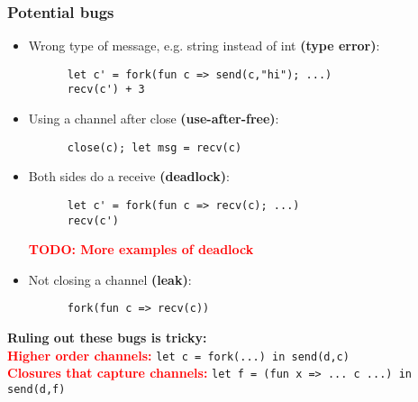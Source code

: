 \documentclass[aspectratio=169]{beamer}
\newcommand{\remph}[1] {\textcolor{red}{\textbf{#1}}}
\begin{document}
\begin{frame}[fragile]
  \frametitle{Potential bugs}

  \begin{itemize}
    \item Wrong type of message, e.g. string instead of int \textbf{(type error)}:
    \begin{lstlisting}
      let c' = fork(fun c => send(c,"hi"); ...)
      recv(c') + 3
    \end{lstlisting}
    \item Using a channel after close \textbf{(use-after-free)}:
    \begin{lstlisting}
      close(c); let msg = recv(c)
    \end{lstlisting}
    \item Both sides do a receive \textbf{(deadlock)}:
    \begin{lstlisting}
      let c' = fork(fun c => recv(c); ...)
      recv(c')
    \end{lstlisting}

    \remph{TODO: More examples of deadlock}
    
    \item Not closing a channel \textbf{(leak)}:
    \begin{lstlisting}
      fork(fun c => recv(c))
    \end{lstlisting}
  \end{itemize}
  \textbf{Ruling out these bugs is tricky:}\\
  \remph{Higher order channels: } \lstinline|let c = fork(...) in send(d,c)| \\
  \remph{Closures that capture channels: } \lstinline|let f = (fun x => ... c ...) in send(d,f)|
\end{frame}
\end{document}
